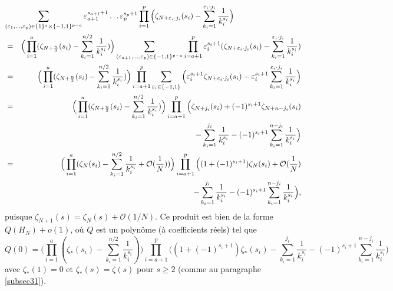 \documentclass[12pt,francais, reqno]{smfart}
\numberwithin{equation}{section}
\newcommand{\gdo}{\mathcal{O}}
\newcommand{\eps}{\varepsilon}
\newcommand{\croix}{\times}
\newcommand{\zetaetoile}{\zeta _*}
\newcommand{\odu}{o(1)}
\begin{document}
\begin{eqnarray*}
\lefteqn{\sum_{(\eps_1, \ldots, \eps_p) \in \{1\}^a \croix \{-1,1\}^{p-a}} \eps_{a+1}^{s_{a+1}+1} \ldots  \eps_p^{s_p+1}
 \prod_{i=1} ^p \Big( \zeta_{N + \eps_i \cdot j_i} (s_i) - \sum_{k_i = 1} ^{\eps_i \cdot j_i} \frac{1}{k_i^{s_i}} \Big)} 
\nonumber \\
& = & \Big(   \prod_{i=1} ^a ( \zeta_{N + \frac{n}{2}} (s_i) - \sum_{k_i = 1} ^{n/2} \frac{1}{k_i^{s_i}} ) \Big)
 \sum_{(\eps_{a+1}, \ldots, \eps_p) \in \{-1,1\}^{p-a}}  \prod_{i=a+1} ^p \eps_i^{s_i+1}  ( \zeta_{N + \eps_i \cdot j_i} (s_i) - \sum_{k_i = 1} ^{\eps_i \cdot j_i} \frac{1}{k_i^{s_i}} ) \\
& = & \Big(   \prod_{i=1} ^a ( \zeta_{N + \frac{n}{2}} (s_i) - \sum_{k_i = 1} ^{n/2} \frac{1}{k_i^{s_i}} ) \Big) 
\prod_{i=a+1} ^p \sum_{\eps_i \in \{-1,1\}} \Big(  \eps_i^{s_i+1} \zeta_{N + \eps_i \cdot j_i} (s_i) -  \eps_i^{s_i+1} \sum_{k_i = 1} ^{\eps_i \cdot j_i} \frac{1}{k_i^{s_i}} \Big) \\
& = & \Big(   \prod_{i=1} ^a ( \zeta_{N + \frac{n}{2}} (s_i) - \sum_{k_i = 1} ^{n/2} \frac{1}{k_i^{s_i}} ) \Big) 
\prod_{i=a+1} ^p \Big( \zeta_{N+j_i}(s_i) +(-1)^{s_i+1}  \zeta_{N+n-j_i} (s_i) \\
&& \hspace{7cm}    -  \sum_{k_i = 1} ^{ j_i} \frac{1}{k_i^{s_i}} - (-1)^{s_i+1}   \sum_{k_i = 1} ^{n- j_i} \frac{1}{k_i^{s_i}}  \Big)\\
& = & \Big(   \prod_{i=1} ^a ( \zeta_{N} (s_i) - \sum_{k_i = 1} ^{n/2} \frac{1}{k_i^{s_i}} + \gdo(\frac{1}{N}) ) \Big) 
\prod_{i=a+1} ^p \Big( (1+(-1)^{s_i+1}) \zeta_N(s_i) + \gdo(\frac{1}{N})  \\
&& \hspace{7cm}    -  \sum_{k_i = 1} ^{ j_i} \frac{1}{k_i^{s_i}} - (-1)^{s_i+1}   \sum_{k_i = 1} ^{n- j_i} \frac{1}{k_i^{s_i}}  \Big), 
 \end{eqnarray*}
puisque $\zeta_{N+1}(s) = \zeta_N(s) +\gdo(1/N)$. Ce produit est bien de la forme $Q(H_N) + \odu$, o\`u $Q$ est un polyn\^ome (\`a coefficients r\'eels) tel que 
$$Q(0) =  \Big(   \prod_{i=1} ^a ( \zetaetoile (s_i) - \sum_{k_i = 1} ^{n/2} \frac{1}{k_i^{s_i}}) \Big) 
\prod_{i=a+1} ^p \Big( (1+(-1)^{s_i+1}) \zetaetoile (s_i)   -  \sum_{k_i = 1} ^{ j_i} \frac{1}{k_i^{s_i}} - (-1)^{s_i+1}   \sum_{k_i = 1} ^{n- j_i} \frac{1}{k_i^{s_i}}  \Big)$$
avec $\zetaetoile(1) = 0$ et $\zetaetoile(s) = \zeta(s)$ pour $s \geq 2$ (comme au  paragraphe \ref{subsec31}). 

\smallskip
\end{document}
